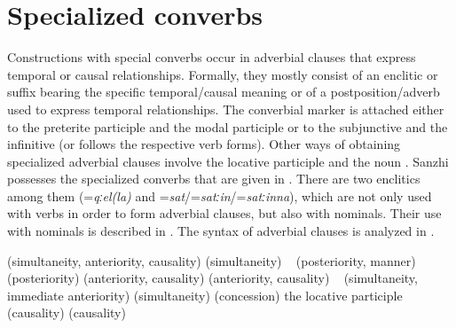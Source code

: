 \section{Specialized converbs}
\label{cpt:specializedconverbssubordinatingenclitics}

Constructions with special converbs occur in adverbial clauses that express temporal or causal relationships. Formally, they mostly consist of an enclitic or suffix bearing the specific temporal/causal meaning or of a postposition\slash adverb used to express temporal relationships. The converbial marker is attached either to the preterite participle and the modal participle or to the subjunctive and the infinitive (or follows the respective verb forms). Other ways of obtaining specialized adverbial clauses involve the locative participle and the noun  . Sanzhi possesses the specialized converbs that are given in . There are two enclitics among them (=\textit{qːel(la)} and =\textit{sat}\slash =\textit{satːin}\slash =\textit{satːinna}), which are not only used with verbs in order to form adverbial clauses, but also with nominals. Their use with nominals is described in . The syntax of adverbial clauses is analyzed in .

\begin{exe}
	\ex	\label{ex:Specialized converbs and subordinating enclitics}
	\begin{xlist}
		\TabPositions{14em}
		\ex	{} 	\tab	(simultaneity, anteriority, causality)	   
		\ex	{} 				\tab	(simultaneity)
		\ex	{} 
		\sn	~\hspace*{1em}					\tab	(posteriority, manner)	   
		\ex	{} 			\tab	(posteriority)
		\ex	{} 			\tab	(anteriority, causality)
		\ex	{} 				\tab	(anteriority, causality)	   
		\ex	{} 
		\sn	~\hspace*{1em}					\tab	(simultaneity, immediate anteriority)	   
		\ex	{} 				\tab	(simultaneity)	   
		\ex	{} 		\tab	(concession)	   
		\ex	the locative participle 			\tab	(causality)	   
		\ex	{} 	\tab	(causality)	
	\end{xlist}
\end{exe}


